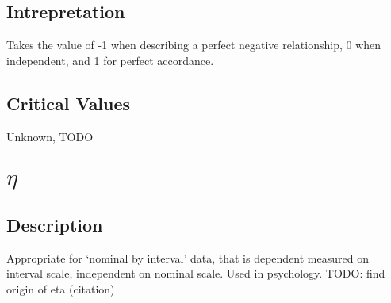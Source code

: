 \documentclass[11pt]{article}
\begin{document}

\subsection{Intrepretation}
Takes the value of -1 when describing a perfect negative relationship, 0 when independent, and 1 for perfect accordance.


\subsection{Critical Values}
Unknown, TODO








\section{$\eta$}
\label{section:eta}
\subsection{Description}
Appropriate for `nominal by interval' data, that is dependent measured on interval scale, independent on nominal scale.  Used in psychology.  
TODO: find origin of eta (citation)

\end{document}
